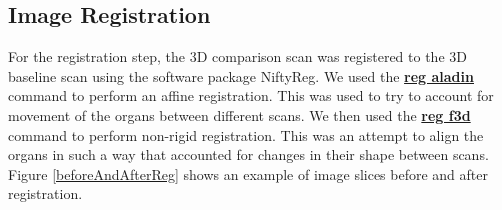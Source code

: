 \documentclass[]{spie}  %
\begin{document}
\subsection{Image Registration}

For the registration step, the 3D comparison scan was registered to the 3D baseline scan using the software package NiftyReg. We used the \textbf{\href{http://cmictig.cs.ucl.ac.uk/wiki/index.php/Reg_aladin}{reg aladin}} command to perform an affine registration\cite{Ourselin01}. This was used to try to account for movement of the organs between different scans. We then used the \textbf{\href{http://cmictig.cs.ucl.ac.uk/wiki/index.php/Reg_f3d}{reg f3d}} command to perform non-rigid registration\cite{Modat10}. This was an attempt to align the organs in such a way that accounted for changes in their shape between scans. Figure \ref{beforeAndAfterReg} shows an example of image slices before and after registration. 
\end{document}
